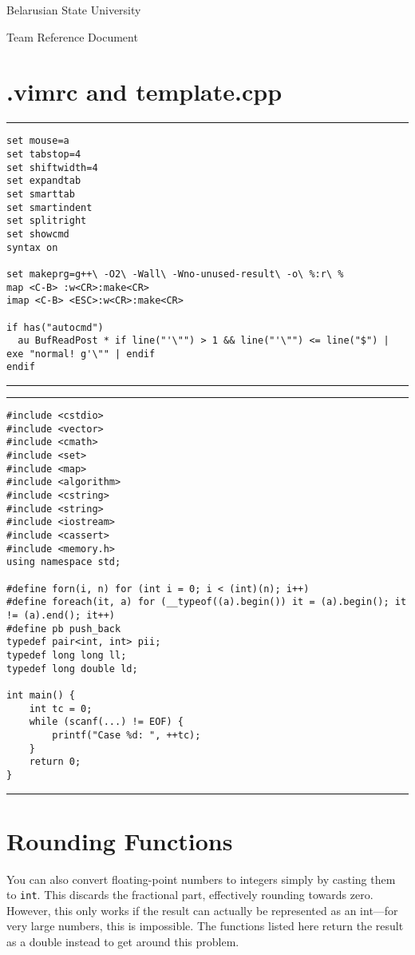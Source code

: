 \documentclass[12pt, titlepage]{article}
\renewcommand{\tt}[1]{\texttt{\small #1}}
\begin{document}
 
\begin{titlepage}
\rule{0pt}{0pt}
\vfill

\centerline{\Huge \textrm{Belarusian State University}}
\vskip 5mm
\centerline{\Large \textsf{Team Reference Document}}

\vfill
\rule{0pt}{0pt}
\end{titlepage}

\section*{.vimrc and template.cpp}

{\color{linescolor}\hrule\vskip2mm}
{\footnotesize\begin{verbatim}
set mouse=a
set tabstop=4
set shiftwidth=4
set expandtab
set smarttab
set smartindent
set splitright
set showcmd
syntax on

set makeprg=g++\ -O2\ -Wall\ -Wno-unused-result\ -o\ %:r\ %
map <C-B> :w<CR>:make<CR>
imap <C-B> <ESC>:w<CR>:make<CR>

if has("autocmd")
  au BufReadPost * if line("'\"") > 1 && line("'\"") <= line("$") | exe "normal! g'\"" | endif
endif
\end{verbatim}
}{\vskip2mm\color{linescolor}\hrule}

{\color{linescolor}\hrule\vskip2mm}
{\footnotesize\begin{verbatim}
#include <cstdio>
#include <vector>
#include <cmath>
#include <set>
#include <map>
#include <algorithm>
#include <cstring>
#include <string>
#include <iostream>
#include <cassert>
#include <memory.h>
using namespace std;

#define forn(i, n) for (int i = 0; i < (int)(n); i++)
#define foreach(it, a) for (__typeof((a).begin()) it = (a).begin(); it != (a).end(); it++)
#define pb push_back
typedef pair<int, int> pii;
typedef long long ll;
typedef long double ld;

int main() {
    int tc = 0;
    while (scanf(...) != EOF) {
        printf("Case %d: ", ++tc);
    }    
    return 0;
}
\end{verbatim}
}{\vskip2mm\color{linescolor}\hrule}

\newpage\tableofcontents

\newpage
\section{Rounding Functions}

You can also convert floating-point numbers to integers simply by casting them to \tt{int}. This discards the fractional part, effectively rounding towards zero. However, this only works if the result can actually be represented as an int—for very large numbers, this is impossible. The functions listed here return the result as a double instead to get around this problem.
\end{document}
